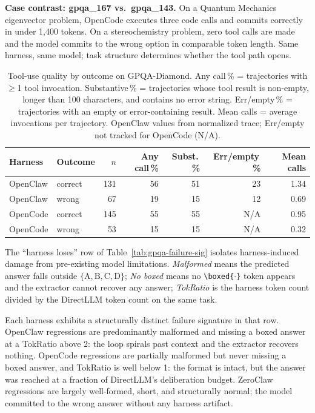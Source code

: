\textbf{Case contrast: gpqa\_167 vs.\ gpqa\_143.}
On a Quantum Mechanics eigenvector problem, OpenCode executes three code calls
and commits correctly in under 1,400 tokens.
On a stereochemistry problem, zero tool calls are made and the model commits to
the wrong option in comparable token length.
Same harness, same model; task structure determines whether the tool path opens.

\begin{table}[t]
\centering
\small
\caption{%
  Tool-use quality by outcome on GPQA-Diamond.
  Any call\,\% = trajectories with $\geq$1 tool invocation.
  Substantive\,\% = trajectories whose tool result is non-empty, longer than
  100 characters, and contains no error string.
  Err/empty\,\% = trajectories with an empty or error-containing result.
  Mean calls = average invocations per trajectory.
  OpenClaw values from normalized trace; Err/empty not tracked for OpenCode (N/A).
}
\label{tab:gpqa-tool-quality}
\setlength{\tabcolsep}{4pt}
\begin{tabular}{llrrrrr}
\toprule
Harness & Outcome & $n$ & Any call\,\% & Subst.\,\% & Err/empty\,\% & Mean calls \\
\midrule
OpenClaw & correct & 131 & 56 & 51 & 23 & 1.34 \\
OpenClaw & wrong   &  67 & 19 & 15 & 12 & 0.69 \\
\midrule
OpenCode & correct & 145 & 55 & 55 & N/A & 0.95 \\
OpenCode & wrong   &  53 & 15 & 15 & N/A & 0.32 \\
\bottomrule
\end{tabular}
\end{table}


The ``harness loses'' row of Table~\ref{tab:gpqa-failure-sig} isolates
harness-induced damage from pre-existing model limitations.
\emph{Malformed} means the predicted answer falls outside $\{\mathrm{A,B,C,D}\}$;
\emph{No boxed} means no \texttt{\textbackslash boxed\{$\cdot$\}} token appears
and the extractor cannot recover any answer; \emph{TokRatio} is the harness
token count divided by the DirectLLM token count on the same task.

Each harness exhibits a structurally distinct failure signature in that row.
OpenClaw regressions are predominantly malformed and missing a boxed answer at
a TokRatio above 2: the loop spirals past context and the extractor recovers
nothing.
OpenCode regressions are partially malformed but never missing a boxed answer,
and TokRatio is well below 1: the format is intact, but the answer was reached
at a fraction of DirectLLM's deliberation budget.
ZeroClaw regressions are largely well-formed, short, and structurally normal;
the model committed to the wrong answer without any harness artifact.

